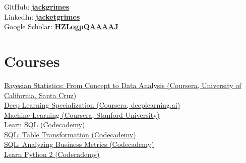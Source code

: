 \documentclass[]{cv-template}
\begin{document}
\begin{minipage}[t]{0.33\textwidth}
GitHub: \href{https://github.com/jackgrimes}{\bf jackgrimes} \\
LinkedIn: \href{https://www.linkedin.com/in/jacketgrimes}{\bf jacketgrimes} \\
Google Scholar: \href{https://scholar.google.co.uk/citations?hl=en&user=HZLogpQAAAAJ}{\bf HZLogpQAAAAJ} \\
\sectionsep


\section{Courses}
\href{https://www.coursera.org/learn/bayesian-statistics}{Bayesian Statistics: From Concept to Data Analysis (Coursera, University of California, Santa Cruz)}\\
\vspace{1.5mm} %
\href{https://www.coursera.org/specializations/deep-learning}{Deep Learning Specialization (Coursera, deeplearning.ai)}\\
\vspace{1.5mm} %
\href{https://www.coursera.org/learn/machine-learning}{Machine Learning (Coursera, Stanford University)} \\
\vspace{1.5mm} %
\href{https://www.codecademy.com/learn/learn-sql}{Learn SQL (Codecademy)} \\
\vspace{1.5mm} %
\href{https://www.codecademy.com/learn/sql-table-transformation}{SQL: Table Transformation (Codecademy)} \\
\vspace{1.5mm} %
\href{https://www.codecademy.com/learn/sql-analyzing-business-metrics}{SQL: Analyzing Business Metrics (Codecademy)} \\
\vspace{1.5mm} %
\href{https://www.codecademy.com/learn/learn-python}{Learn Python 2 (Codecademy)} \\
\sectionsep


\end{minipage}
\end{document}
